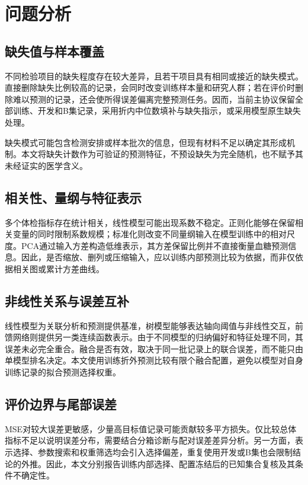 \section{问题分析}\label{sec:analysis}

\subsection{缺失值与样本覆盖}
不同检验项目的缺失程度存在较大差异，且若干项目具有相同或接近的缺失模式。直接删除缺失比例较高的记录，会同时改变训练样本量和研究人群；若在评价时删除难以预测的记录，还会使所得误差偏离完整预测任务。因而，当前主协议保留全部训练、开发和B集记录，采用折内中位数填补与缺失指示，或采用模型原生缺失处理。

缺失模式可能包含检测安排或样本批次的信息，但现有材料不足以确定其形成机制。本文将缺失计数作为可验证的预测特征，不预设缺失为完全随机，也不赋予其未经证实的医学含义。

\subsection{相关性、量纲与特征表示}
多个体检指标存在统计相关，线性模型可能出现系数不稳定。正则化能够在保留相关变量的同时限制系数规模；标准化则改变不同量纲输入在模型训练中的相对尺度。PCA通过输入方差构造低维表示，其方差保留比例并不直接衡量血糖预测信息。因此，是否缩放、删列或压缩输入，应以训练内部预测比较为依据，而非仅依据相关图或累计方差曲线。

\subsection{非线性关系与误差互补}
线性模型为关联分析和预测提供基准，树模型能够表达轴向阈值与非线性交互，前馈网络则提供另一类连续函数表示。由于不同模型的归纳偏好和特征处理不同，其误差未必完全重合。融合是否有效，取决于同一批记录上的联合误差，而不能只由单模型排名决定。本文使用训练折外预测比较有限个融合配置，避免以模型对自身训练记录的拟合预测选择权重。

\subsection{评价边界与尾部误差}
MSE对较大误差更敏感，少量高目标值记录可能贡献较多平方损失。仅比较总体指标不足以说明误差分布，需要结合分箱诊断与配对误差差异分析。另一方面，表示选择、参数搜索和权重筛选均会引入选择偏差，重复使用开发或B集也会限制结论的外推。因此，本文分别报告训练内部选择、配置冻结后的已知集合复核及其条件不确定性。
